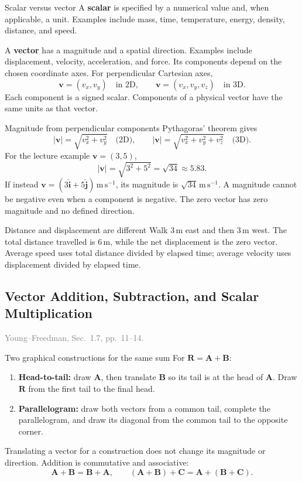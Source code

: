 \documentclass[11pt,letterpaper]{article}
\newcommand{\vect}[1]{\boldsymbol{#1}}
\newcommand{\uv}[1]{\hat{\boldsymbol{#1}}}
\newcommand{\unit}[1]{\,\mathrm{#1}}
\newcommand{\bookref}[2]{\textcolor{gray}{\footnotesize Young--Freedman, Sec.~#1, pp.~#2.}}
\begin{document}
\begin{defbox}{Scalar versus vector}
A \textbf{scalar} is specified by a numerical value and, when applicable, a unit. Examples include mass, time, temperature, energy, density, distance, and speed.

A \textbf{vector} has a magnitude and a spatial direction. Examples include displacement, velocity, acceleration, and force. Its components depend on the chosen coordinate axes. For perpendicular Cartesian axes,
\[
 \vect v=(v_x,v_y)\quad\text{in 2D},\qquad
 \vect v=(v_x,v_y,v_z)\quad\text{in 3D}.
\]
Each component is a signed scalar. Components of a physical vector have the same units as that vector.
\end{defbox}

\begin{derivbox}{Magnitude from perpendicular components}
Pythagoras' theorem gives
\[
 \boxed{|\vect v|=\sqrt{v_x^2+v_y^2}\quad\text{(2D)},\qquad
 |\vect v|=\sqrt{v_x^2+v_y^2+v_z^2}\quad\text{(3D)}.}
\]
For the lecture example $\vect v=(3,5)$,
\[
 |\vect v|=\sqrt{3^2+5^2}=\sqrt{34}\approx5.83.
\]
If instead $\vect v=(3\uv i+5\uv j)\unit{m\,s^{-1}}$, its magnitude is
$\sqrt{34}\unit{m\,s^{-1}}$. A magnitude cannot be negative even when a component is negative. The zero vector has zero magnitude and no defined direction.
\end{derivbox}

\begin{examplebox}{Distance and displacement are different}
Walk $3\unit{m}$ east and then $3\unit{m}$ west. The total distance travelled is $6\unit{m}$, while the net displacement is the zero vector. Average speed uses total distance divided by elapsed time; average velocity uses displacement divided by elapsed time.
\end{examplebox}

\subsection{Vector Addition, Subtraction, and Scalar Multiplication}
\bookref{1.7}{11--14}

\begin{rulebox}{Two graphical constructions for the same sum}
For $\vect R=\vect A+\vect B$:
\begin{enumerate}
\item \textbf{Head-to-tail:} draw $\vect A$, then translate $\vect B$ so its tail is at the head of $\vect A$. Draw $\vect R$ from the first tail to the final head.
\item \textbf{Parallelogram:} draw both vectors from a common tail, complete the parallelogram, and draw its diagonal from the common tail to the opposite corner.
\end{enumerate}
Translating a vector for a construction does not change its magnitude or direction. Addition is commutative and associative:
\[
 \vect A+\vect B=\vect B+\vect A,\qquad
 (\vect A+\vect B)+\vect C=\vect A+(\vect B+\vect C).
\]
\end{rulebox}
\end{document}
